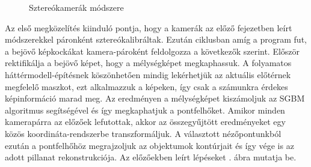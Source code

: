 \begin{figure}[t]

\caption{Sztereókamerák módszere \label{fig:stereo-method}}
\end{figure}

Az első megközelítés kiinduló pontja, hogy a kamerák az előző fejezetben leírt módszerekkel páronként sztereókalibráltak. Ezután ciklusban amíg a program fut, a bejövő képkockákat kamera-pároként feldolgozza a következők szerint. Először rektifikálja a bejövő képet, hogy a mélységképet megkaphassuk. A folyamatos háttérmodell-építésnek köszönhetően mindig lekérhetjük az aktuális előtérnek megfelelő maszkot, ezt alkalmazzuk a képeken, így csak a számunkra érdekes képinformáció marad meg. Az eredményen a mélységképet kiszámoljuk az SGBM algoritmus segítségével és így megkaphatjuk a pontfelhőket. Amikor minden kamerapárra az előzőek lefutottak, akkor az összegyűjtött eredményeket egy közös koordináta-rendszerbe transzformáljuk. A választott nézőpontunkból ezután a pontfelhőhöz megrajzoljuk az objektumok kontúrjait és így vége is az adott pillanat rekonstrukciója. Az előzőekben leírt lépéseket . ábra mutatja be. 

